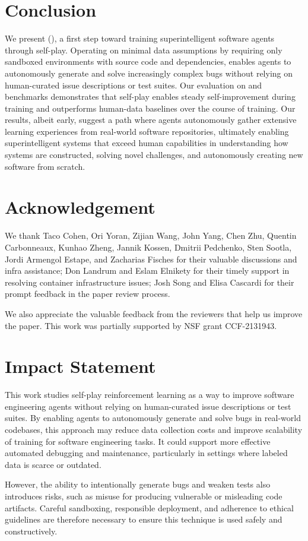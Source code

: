 

\section{Conclusion}
We present \techfull (\tech), a first step toward training superintelligent software agents through self-play.
Operating on minimal data assumptions by requiring only sandboxed environments with source code and dependencies, \tech enables agents to autonomously generate and solve increasingly complex bugs without relying on human-curated issue descriptions or test suites.
Our evaluation on \sbv and \sbp benchmarks demonstrates that self-play enables steady self-improvement during training and outperforms human-data baselines over the course of training. Our results, albeit early, suggest a path where agents autonomously gather extensive learning experiences from real-world software repositories, ultimately enabling superintelligent systems that exceed human capabilities in understanding how systems are constructed, solving novel challenges, and autonomously creating new software from scratch.

\section*{Acknowledgement}

We thank Taco Cohen, Ori Yoran, Zijian Wang, John Yang, Chen Zhu, Quentin Carbonneaux, Kunhao Zheng, Jannik Kossen, Dmitrii Pedchenko, Sten Sootla, Jordi Armengol Estape, and Zacharias Fisches for their valuable discussions and infra assistance;
Don Landrum and Eslam Elnikety for their timely support in resolving container infrastructure issues; Josh Song and Elisa Cascardi for their prompt feedback in the paper review process.

We also appreciate the valuable feedback from the reviewers that help us improve the paper. This work was partially supported by NSF grant CCF-2131943.

\section*{Impact Statement}
This work studies self-play reinforcement learning as a way to improve software engineering agents without relying on human-curated issue descriptions or test suites. By enabling agents to autonomously generate and solve bugs in real-world codebases, this approach may reduce data collection costs and improve scalability of training for software engineering tasks. It could support more effective automated debugging and maintenance, particularly in settings where labeled data is scarce or outdated.

However, the ability to intentionally generate bugs and weaken tests also introduces risks, such as misuse for producing vulnerable or misleading code artifacts. Careful sandboxing, responsible deployment, and adherence to ethical guidelines are therefore necessary to ensure this technique is used safely and constructively.



